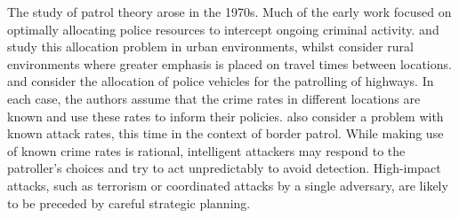 \documentclass[11pt,a4paper]{article}
\begin{document}
The study of patrol theory arose in the 1970s.
Much of the early work
focused on optimally allocating police resources to intercept ongoing criminal activity.
\cite{chelst1978} and \cite{Chaiken1978} study this allocation problem in urban environments, %
whilst \cite{Birge1989} consider rural environments where greater emphasis is placed on travel times between locations. \cite{lee1979} and \cite{taylor1985} consider the allocation of police vehicles for the patrolling of highways.
In each case, the authors assume that the crime rates in different locations are known and use these rates to inform their policies.
\cite{szechtman2008} also consider a problem with known attack rates, this time in the context of border patrol.
While making use of known crime rates is rational, intelligent attackers may respond to the patroller's choices and try to act unpredictably to avoid detection. High-impact attacks, such as terrorism or coordinated attacks by a single adversary, are likely to be preceded by careful strategic planning.
\end{document}
